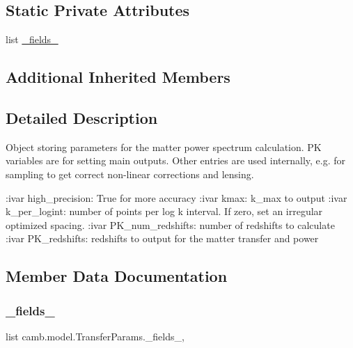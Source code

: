 \subsection*{Static Private Attributes}
\begin{DoxyCompactItemize}
\item 
list \mbox{\hyperlink{classcamb_1_1model_1_1TransferParams_a9aac715894231a1a01bc7a4c716b2357}{\+\_\+fields\+\_\+}}
\end{DoxyCompactItemize}
\subsection*{Additional Inherited Members}


\subsection{Detailed Description}
\begin{DoxyVerb}Object storing parameters for the matter power spectrum calculation. PK variables are for setting main outputs.
Other entries are used internally, e.g. for sampling to get correct non-linear corrections and lensing.

:ivar high_precision: True for more accuracy
:ivar kmax: k_max to output
:ivar k_per_logint: number of points per log k interval. If zero, set an irregular optimized spacing.
:ivar PK_num_redshifts: number of redshifts to calculate
:ivar PK_redshifts: redshifts to output for the matter transfer and power\end{DoxyVerb}
 

\subsection{Member Data Documentation}
\mbox{\label{classcamb_1_1model_1_1TransferParams_a9aac715894231a1a01bc7a4c716b2357}} 
\subsubsection{\texorpdfstring{\+\_\+fields\+\_\+}{\_fields\_}}
{\footnotesize\ttfamily list camb.\+model.\+Transfer\+Params.\+\_\+fields\+\_\+\hspace{0.3cm}{\ttfamily [static]}, {\ttfamily [private]}}

